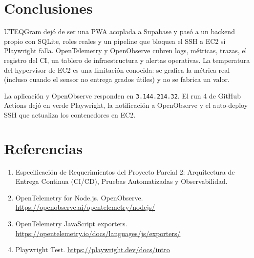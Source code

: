 \documentclass[12pt,letterpaper]{article}
\begin{document}
\section{Conclusiones}

UTEQGram dej\'o de ser una PWA acoplada a Supabase y pas\'o a un backend propio con SQLite, roles reales y un pipeline que bloquea el SSH a EC2 si Playwright falla. OpenTelemetry y OpenObserve cubren logs, m\'etricas, trazas, el registro del CI, un tablero de infraestructura y alertas operativas. La temperatura del hypervisor de EC2 es una limitaci\'on conocida: se grafica la m\'etrica real (incluso cuando el sensor no entrega grados \'utiles) y no se fabrica un valor.

La aplicaci\'on y OpenObserve responden en \texttt{3.144.214.32}. El run 4 de GitHub Actions dej\'o en verde Playwright, la notificaci\'on a OpenObserve y el auto-deploy SSH que actualiza los contenedores en EC2.

\section{Referencias}

\begin{enumerate}
\item Especificaci\'on de Requerimientos del Proyecto Parcial 2: Arquitectura de Entrega Continua (CI/CD), Pruebas Automatizadas y Observabilidad.
\item OpenTelemetry for Node.js. OpenObserve. \url{https://openobserve.ai/opentelemetry/nodejs/}
\item OpenTelemetry JavaScript exporters. \url{https://opentelemetry.io/docs/languages/js/exporters/}
\item Playwright Test. \url{https://playwright.dev/docs/intro}
\end{enumerate}
\end{document}
